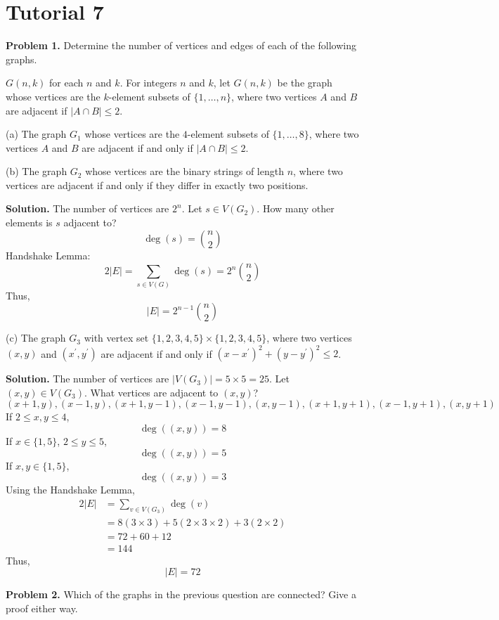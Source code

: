 \section{Tutorial 7}
\textbf{Problem 1.} Determine the number of vertices
and edges of each of the following graphs.

$ G(n,k) $ for each $ n $ and $ k $. For integers $ n $ and $ k $,
let $ G(n,k) $ be the graph whose vertices are the $ k $-element subsets
of $ \{1,\ldots ,n\} $, where two vertices $ A $ and $ B $ are
adjacent if $ |A\cap B|\leqslant 2 $.

(a) The graph $ G_1 $ whose vertices are the $ 4 $-element subsets of
$ \{1,\ldots ,8\} $, where two vertices $ A $ and $ B $ are adjacent
if and only if $ |A\cap B|\leqslant 2 $.

(b) The graph $ G_2 $ whose vertices are the binary strings of length $ n $,
where two vertices are adjacent if and only if they differ in exactly
two positions.

\textbf{Solution.} The number of vertices are $ 2^n $.
Let $ s\in V(G_2) $. How many other elements is $ s $ adjacent to?
\[ \deg(s)=\binom{n}{2} \]
Handshake Lemma:
\[ 2|E|=\sum\limits_{s\in V(G)}\deg(s)=2^n\binom{n}{2} \]
Thus,
\[ |E|=2^{n-1}\binom{n}{2} \]

(c) The graph $ G_3 $ with vertex set $ \{1,2,3,4,5\}\times \{1,2,3,4,5\} $,
where two vertices $ (x,y) $ and $ (x^\prime, y^\prime) $ are
adjacent if and only if $ (x-x^\prime)^2+(y-y^\prime)^2\leqslant 2 $.

\textbf{Solution.} The number of vertices are $ |V(G_3)|=5\times 5=25 $.
Let $ (x,y)\in V(G_3) $. What vertices are adjacent to $ (x,y) $?
\[ (x+1,y),(x-1,y),(x+1,y-1),(x-1,y-1),(x,y-1),(x+1,y+1),(x-1,y+1),(x,y+1) \]
If $ 2\leqslant x,y \leqslant 4 $,
\[ \deg((x,y))=8 \]
If $ x\in \{1,5\} $, $ 2\leqslant y\leqslant 5 $,
\[ \deg((x,y))=5 \]
If $ x,y\in \{1,5\} $,
\[ \deg((x,y))=3 \]
Using the Handshake Lemma,
\begin{align*}
    2|E|
     & =\sum\limits_{v\in V(G_3)} \deg(v)              \\
     & =8(3\times 3)+5(2\times 3\times 2)+3(2\times 2) \\
     & =72+60+12                                       \\
     & =144
\end{align*}
Thus,
\[ |E|=72 \]

\textbf{Problem 2.} Which of the graphs in the previous question are connected?
Give a proof either way.

